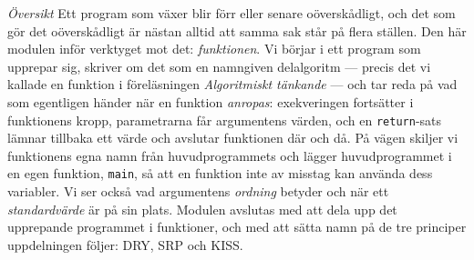 \emph{Översikt}
Ett program som växer blir förr eller senare oöverskådligt, och det som
gör det oöverskådligt är nästan alltid att samma sak står på flera
ställen.  Den här modulen inför verktyget mot det: \emph{funktionen}.  Vi
börjar i ett program som upprepar sig, skriver om det som en namngiven
delalgoritm --- precis det vi kallade en funktion i föreläsningen
\emph{Algoritmiskt tänkande} --- och tar reda på vad som egentligen
händer när en funktion \emph{anropas}: exekveringen fortsätter i
funktionens kropp,
parametrarna får argumentens värden, och en
\texttt{return}-sats lämnar tillbaka ett värde och avslutar
funktionen där och då.  På vägen skiljer vi funktionens egna namn från
huvudprogrammets och lägger huvudprogrammet i en egen funktion,
\texttt{main}, så att en funktion inte av misstag kan
använda dess variabler.  Vi ser också vad argumentens \emph{ordning}
betyder och när ett \emph{standardvärde} är på sin plats.  Modulen
avslutas med att dela upp det upprepande programmet i funktioner, och
med att sätta namn på de tre principer uppdelningen följer: DRY, SRP
och KISS.

